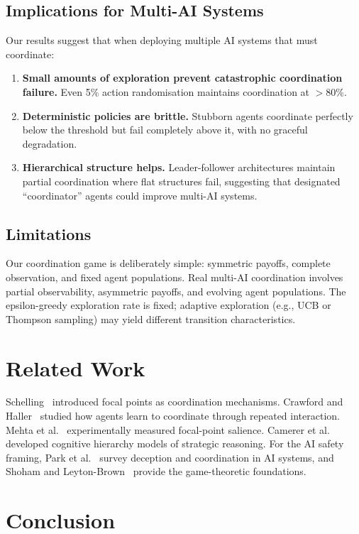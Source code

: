 \documentclass[11pt]{article}
\begin{document}
\subsection{Implications for Multi-AI Systems}
Our results suggest that when deploying multiple AI systems that must coordinate:
\begin{enumerate}
  \item \textbf{Small amounts of exploration prevent catastrophic coordination failure.} Even 5\% action randomisation maintains coordination at $>$80\%.
  \item \textbf{Deterministic policies are brittle.} Stubborn agents coordinate perfectly below the threshold but fail completely above it, with no graceful degradation.
  \item \textbf{Hierarchical structure helps.} Leader-follower architectures maintain partial coordination where flat structures fail, suggesting that designated ``coordinator'' agents could improve multi-AI systems.
\end{enumerate}

\subsection{Limitations}
Our coordination game is deliberately simple: symmetric payoffs, complete observation, and fixed agent populations.
Real multi-AI coordination involves partial observability, asymmetric payoffs, and evolving agent populations.
The epsilon-greedy exploration rate is fixed; adaptive exploration (e.g., UCB or Thompson sampling) may yield different transition characteristics.

\section{Related Work}

Schelling~\cite{schelling1960} introduced focal points as coordination mechanisms.
Crawford and Haller~\cite{crawford1990} studied how agents learn to coordinate through repeated interaction.
Mehta et al.~\cite{mehta1994} experimentally measured focal-point salience.
Camerer et al.~\cite{camerer2004} developed cognitive hierarchy models of strategic reasoning.
For the AI safety framing, Park et al.~\cite{park2023} survey deception and coordination in AI systems, and Shoham and Leyton-Brown~\cite{shoham2008} provide the game-theoretic foundations.

\section{Conclusion}
\end{document}
